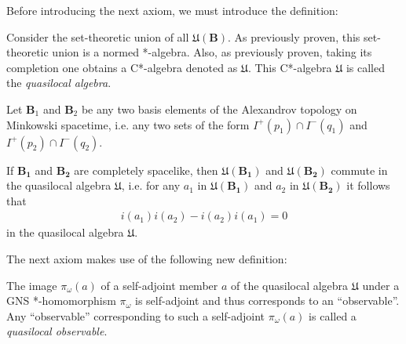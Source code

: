 Before introducing the next axiom, we must introduce the definition:

\begin{definition}
    \label{def:quasilocal-algebra}
    \leanok
    Consider the set-theoretic union of all $\mathfrak{U}(\mathbf{B})$. As previously proven, this set-theoretic union is a normed *-algebra. Also, as previously proven, taking its completion one obtains a C*-algebra denoted as $\mathfrak{U}$. This C*-algebra $\mathfrak{U}$ is called the \textit{quasilocal algebra}.
\end{definition}

\begin{definition}
    \label{def:local-commutativity}
    \leanok
    Let $\mathbf{B}_1$ and $\mathbf{B}_2$ be any two basis elements of the Alexandrov topology on Minkowski spacetime, i.e. any two sets of the form $I^+(p_1) \cap I^-(q_1)$ and $I^+(p_2) \cap I^-(q_2)$.

    If $\mathbf{B_1}$ and $\mathbf{B_2}$ are completely spacelike, then $\mathfrak{U}(\mathbf{B_1})$ and $\mathfrak{U}(\mathbf{B_2})$ commute in the quasilocal algebra $\mathfrak{U}$, i.e. for any $a_1$ in $\mathfrak{U}(\mathbf{B_1})$ and $a_2$ in $\mathfrak{U}(\mathbf{B_2})$ it follows that
    \begin{align}
        i(a_1) i(a_2) - i(a_2) i(a_1) = 0
    \end{align}
    in the quasilocal algebra $\mathfrak{U}$.
\end{definition}

The next axiom makes use of the following new definition:

\begin{definition}
    \label{def:quasilocal-observable}
    \leanok
    The image $\pi_\omega(a)$ of a self-adjoint member $a$ of the quasilocal algebra $\mathfrak{U}$ under a GNS *-homomorphism $\pi_\omega$ is self-adjoint and thus corresponds to an ``observable''. Any ``observable'' corresponding to such a self-adjoint $\pi_\omega(a)$ is called a \textit{quasilocal observable}.
\end{definition}

